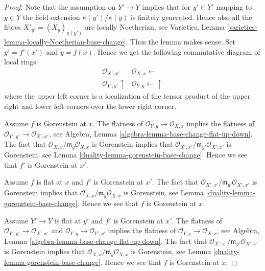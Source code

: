 \begin{proof}

Note that the assumption on $Y' \to Y$ implies that for $y' \in Y'$
mapping to $y \in Y$ the field extension $\kappa(y')/\kappa(y)$
is finitely generated. Hence also all the fibres
$X'_{y'} = (X_y)_{\kappa(y')}$ are locally Noetherian, see
Varieties, Lemma \ref{varieties-lemma-locally-Noetherian-base-change}.
Thus the lemma makes sense. Set $y' = f'(x')$ and $y = f(x)$.
Hence we get the following commutative diagram of local rings
$$
\begin{array}{cc}\mathcal{O}_{X', x'} & \mathcal{O}_{X, x} \longleftarrow \\ \mathcal{O}_{Y', y'} \uparrow & \mathcal{O}_{Y, y} \longleftarrow\uparrow\end{array}
$$
where the upper left corner is a localization of the tensor product
of the upper right and lower left corners over the lower right corner.

\medskip\noindent
Assume $f$ is Gorenstein at $x$.
The flatness of $\mathcal{O}_{Y, y} \to \mathcal{O}_{X, x}$
implies the flatness of $\mathcal{O}_{Y', y'} \to \mathcal{O}_{X', x'}$, see
Algebra, Lemma \ref{algebra-lemma-base-change-flat-up-down}.
The fact that $\mathcal{O}_{X, x}/\mathfrak m_y\mathcal{O}_{X, x}$
is Gorenstein implies that
$\mathcal{O}_{X', x'}/\mathfrak m_{y'}\mathcal{O}_{X', x'}$
is Gorenstein, see
Lemma \ref{duality-lemma-gorenstein-base-change}. Hence we see that $f'$
is Gorenstein at $x'$.

\medskip\noindent
Assume $f$ is flat at $x$ and $f'$ is Gorenstein at $x'$.
The fact that $\mathcal{O}_{X', x'}/\mathfrak m_{y'}\mathcal{O}_{X', x'}$
is Gorenstein implies that
$\mathcal{O}_{X, x}/\mathfrak m_y\mathcal{O}_{X, x}$
is Gorenstein, see
Lemma \ref{duality-lemma-gorenstein-base-change}. Hence we see that $f$
is Gorenstein at $x$.

\medskip\noindent
Assume $Y' \to Y$ is flat at $y'$ and $f'$ is Gorenstein at
$x'$. The flatness of $\mathcal{O}_{Y', y'} \to \mathcal{O}_{X', x'}$
and $\mathcal{O}_{Y, y} \to \mathcal{O}_{Y', y'}$ implies the flatness
of $\mathcal{O}_{Y, y} \to \mathcal{O}_{X, x}$, see
Algebra, Lemma \ref{algebra-lemma-base-change-flat-up-down}.
The fact that $\mathcal{O}_{X', x'}/\mathfrak m_{y'}\mathcal{O}_{X', x'}$
is Gorenstein implies that
$\mathcal{O}_{X, x}/\mathfrak m_y\mathcal{O}_{X, x}$
is Gorenstein, see
Lemma \ref{duality-lemma-gorenstein-base-change}. Hence we see that $f$
is Gorenstein at $x$.
\end{proof}

